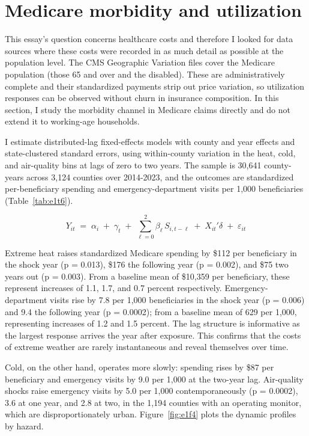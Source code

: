 \documentclass[a4paper,11pt]{report}
\begin{document}
\FloatBarrier
\section{Medicare morbidity and utilization}

This essay's question concerns healthcare costs and therefore I looked for data sources where these costs were recorded in as much detail as possible at the population level. The CMS Geographic Variation files cover the Medicare population (those 65 and over and the disabled). These are administratively complete and their standardized payments strip out price variation, so utilization responses can be observed without churn in insurance composition. In this section, I study the morbidity channel in Medicare claims directly and do not extend it to working-age households.

I estimate distributed-lag fixed-effects models with county and year effects and state-clustered standard errors, using within-county variation in the heat, cold, and air-quality bins at lags of zero to two years. The sample is 30,641 county-years across 3,124 counties over 2014-2023, and the outcomes are standardized per-beneficiary spending and emergency-department visits per 1,000 beneficiaries (Table~\ref{tab:e1t6}).



\begin{equation}
Y_{it} \;=\; \alpha_i \;+\; \gamma_t \;+\; \sum_{\ell=0}^{2} \beta_\ell \, S_{i,t-\ell}
\;+\; X_{it}'\delta \;+\; \varepsilon_{it}
\label{eq:dlag}
\end{equation}

Extreme heat raises standardized Medicare spending by \$112 per beneficiary in the shock year (p = 0.013), \$176 the following year (p = 0.002), and \$75 two years out (p = 0.003). From a baseline mean of \$10,359 per beneficiary, these represent increases of 1.1, 1.7, and 0.7 percent respectively. Emergency-department visits rise by 7.8 per 1,000 beneficiaries in the shock year (p = 0.006) and 9.4 the following year (p = 0.0002); from a baseline mean of 629 per 1,000, representing increases of 1.2 and 1.5 percent. The lag structure is informative as the largest response arrives the year after exposure. This confirms that the costs of extreme weather are rarely instantaneous and reveal themselves over time.

Cold, on the other hand, operates more slowly: spending rises by \$87 per beneficiary and emergency visits by 9.0 per 1,000 at the two-year lag. Air-quality shocks raise emergency visits by 5.0 per 1,000 contemporaneously (p = 0.0002), 3.6 at one year, and 2.8 at two, in the 1,194 counties with an operating monitor, which are disproportionately urban. Figure~\ref{fig:e1f4} plots the dynamic profiles by hazard.
\end{document}
